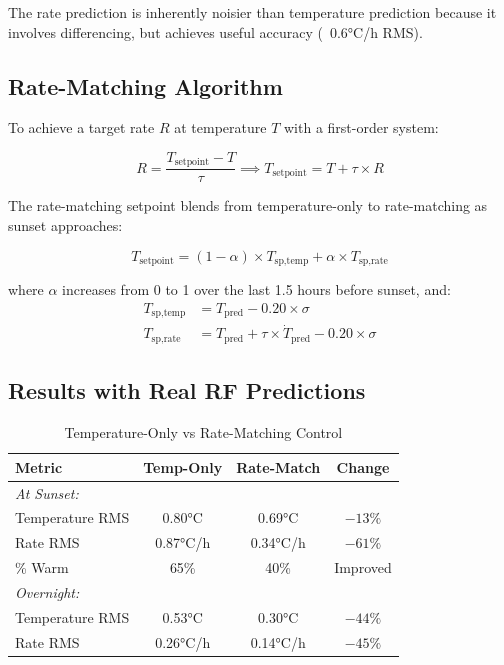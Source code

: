 \documentclass[11pt,letterpaper]{article}
\begin{document}
The rate prediction is inherently noisier than temperature prediction because it involves differencing, but achieves useful accuracy (~0.6°C/h RMS).

\subsection{Rate-Matching Algorithm}

To achieve a target rate $R$ at temperature $T$ with a first-order system:

\begin{equation}
R = \frac{T_{\text{setpoint}} - T}{\tau} \implies T_{\text{setpoint}} = T + \tau \times R
\end{equation}

The rate-matching setpoint blends from temperature-only to rate-matching as sunset approaches:

\begin{equation}
T_{\text{setpoint}} = (1 - \alpha) \times T_{\text{sp,temp}} + \alpha \times T_{\text{sp,rate}}
\end{equation}

where $\alpha$ increases from 0 to 1 over the last 1.5 hours before sunset, and:
\begin{align}
T_{\text{sp,temp}} &= T_{\text{pred}} - 0.20 \times \sigma \\
T_{\text{sp,rate}} &= T_{\text{pred}} + \tau \times \dot{T}_{\text{pred}} - 0.20 \times \sigma
\end{align}

\subsection{Results with Real RF Predictions}

\begin{table}[h]
\centering
\caption{Temperature-Only vs Rate-Matching Control}
\begin{tabular}{lccc}
\toprule
\textbf{Metric} & \textbf{Temp-Only} & \textbf{Rate-Match} & \textbf{Change} \\
\midrule
\multicolumn{4}{l}{\textit{At Sunset:}} \\
\quad Temperature RMS & 0.80°C & 0.69°C & $-13\%$ \\
\quad Rate RMS & 0.87°C/h & 0.34°C/h & $-61\%$ \\
\quad \% Warm & 65\% & 40\% & Improved \\
\midrule
\multicolumn{4}{l}{\textit{Overnight:}} \\
\quad Temperature RMS & 0.53°C & 0.30°C & $-44\%$ \\
\quad Rate RMS & 0.26°C/h & 0.14°C/h & $-45\%$ \\
\bottomrule
\end{tabular}
\end{table}
\end{document}
